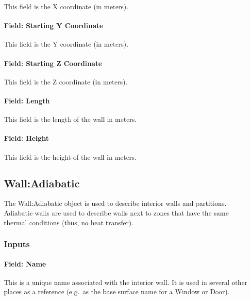 This field is the X coordinate (in meters).

\paragraph{Field: Starting Y Coordinate}\label{field-starting-y-coordinate}

This field is the Y coordinate (in meters).

\paragraph{Field: Starting Z Coordinate}\label{field-starting-z-coordinate}

This field is the Z coordinate (in meters).

\paragraph{Field: Length}\label{field-length-000}

This field is the length of the wall in meters.

\paragraph{Field: Height}\label{field-height-000}

This field is the height of the wall in meters.

\subsection{Wall:Adiabatic}\label{walladiabatic}

The Wall:Adiabatic object is used to describe interior walls and partitions. Adiabatic walls are used to describe walls next to zones that have the same thermal conditions (thus, no heat transfer).

\subsubsection{Inputs}\label{inputs-5-032}

\paragraph{Field: Name}\label{field-name-1-044}

This is a unique name associated with the interior wall. It is used in several other places as a reference (e.g.~as the base surface name for a Window or Door).

